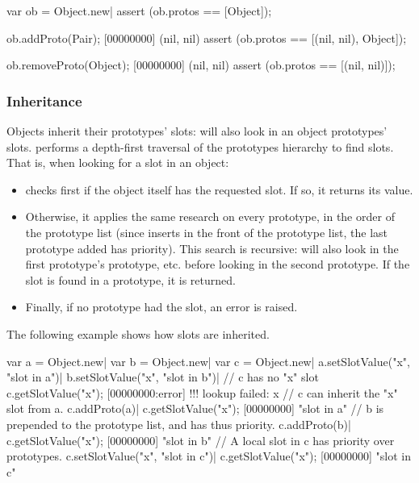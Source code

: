 \begin{urbiscript}
var ob = Object.new|
assert (ob.protos == [Object]);

ob.addProto(Pair);
[00000000] (nil, nil)
assert (ob.protos == [(nil, nil), Object]);

ob.removeProto(Object);
[00000000] (nil, nil)
assert (ob.protos == [(nil, nil)]);
\end{urbiscript}

\subsubsection{Inheritance}

Objects inherit their prototypes' slots:  will also
look in an object prototypes' slots.  performs a
depth-first traversal of the prototypes hierarchy to find slots. That is,
when looking for a slot in an object:

\begin{itemize}
\item {} checks first if the object itself has the
  requested slot. If so, it returns its value.
\item Otherwise, it applies the same research on every prototype, in the
  order of the prototype list (since  inserts in
  the front of the prototype list, the last prototype added has
  priority). This search is recursive:  will also
  look in the first prototype's prototype, etc. before looking in the second
  prototype. If the slot is found in a prototype, it is returned.
\item Finally, if no prototype had the slot, an error is raised.
\end{itemize}

The following example shows how slots are inherited.

\begin{urbiscript}[firstnumber=1]
var a = Object.new|
var b = Object.new|
var c = Object.new|
a.setSlotValue("x", "slot in a")|
b.setSlotValue("x", "slot in b")|
// c has no "x" slot
c.getSlotValue("x");
[00000000:error] !!! lookup failed: x
// c can inherit the "x" slot from a.
c.addProto(a)|
c.getSlotValue("x");
[00000000] "slot in a"
// b is prepended to the prototype list, and has thus priority.
c.addProto(b)|
c.getSlotValue("x");
[00000000] "slot in b"
// A local slot in c has priority over prototypes.
c.setSlotValue("x", "slot in c")|
c.getSlotValue("x");
[00000000] "slot in c"
\end{urbiscript}

